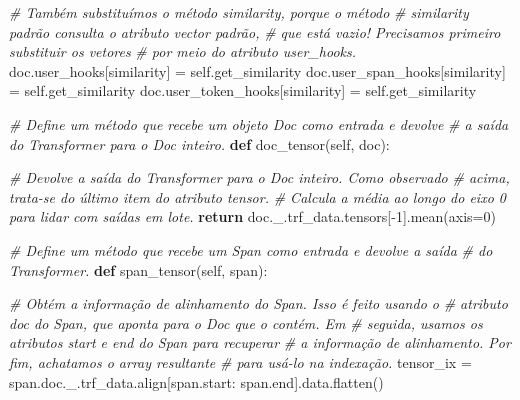 \documentclass[
  brazilian,
]{article}
\newenvironment{Shaded}{}{}
\newcommand{\CommentTok}[1]{\textcolor[rgb]{0.38,0.63,0.69}{\textit{#1}}}
\newcommand{\ControlFlowTok}[1]{\textcolor[rgb]{0.00,0.44,0.13}{\textbf{#1}}}
\newcommand{\DecValTok}[1]{\textcolor[rgb]{0.25,0.63,0.44}{#1}}
\newcommand{\KeywordTok}[1]{\textcolor[rgb]{0.00,0.44,0.13}{\textbf{#1}}}
\newcommand{\NormalTok}[1]{#1}
\newcommand{\OperatorTok}[1]{\textcolor[rgb]{0.40,0.40,0.40}{#1}}
\newcommand{\StringTok}[1]{\textcolor[rgb]{0.25,0.44,0.63}{#1}}
\newcommand{\VariableTok}[1]{\textcolor[rgb]{0.10,0.09,0.49}{#1}}
\begin{document}
\begin{Shaded}
\begin{Highlighting}[]
        \CommentTok{\# Também substituímos o método \textquotesingle{}similarity\textquotesingle{}, porque o método}
        \CommentTok{\# \textquotesingle{}similarity\textquotesingle{} padrão consulta o atributo \textquotesingle{}vector\textquotesingle{} padrão,}
        \CommentTok{\# que está vazio! Precisamos primeiro substituir os vetores}
        \CommentTok{\# por meio do atributo \textquotesingle{}user\_hooks\textquotesingle{}.}
\NormalTok{        doc.user\_hooks[}\StringTok{\textquotesingle{}similarity\textquotesingle{}}\NormalTok{] }\OperatorTok{=} \VariableTok{self}\NormalTok{.get\_similarity}
\NormalTok{        doc.user\_span\_hooks[}\StringTok{\textquotesingle{}similarity\textquotesingle{}}\NormalTok{] }\OperatorTok{=} \VariableTok{self}\NormalTok{.get\_similarity}
\NormalTok{        doc.user\_token\_hooks[}\StringTok{\textquotesingle{}similarity\textquotesingle{}}\NormalTok{] }\OperatorTok{=} \VariableTok{self}\NormalTok{.get\_similarity}
    
    \CommentTok{\# Define um método que recebe um objeto Doc como entrada e devolve}
    \CommentTok{\# a saída do Transformer para o Doc inteiro.}
    \KeywordTok{def}\NormalTok{ doc\_tensor(}\VariableTok{self}\NormalTok{, doc):}
        
        \CommentTok{\# Devolve a saída do Transformer para o Doc inteiro. Como observado}
        \CommentTok{\# acima, trata{-}se do último item do atributo \textquotesingle{}tensor\textquotesingle{}.}
        \CommentTok{\# Calcula a média ao longo do eixo 0 para lidar com saídas em lote.}
        \ControlFlowTok{return}\NormalTok{ doc.\_.trf\_data.tensors[}\OperatorTok{{-}}\DecValTok{1}\NormalTok{].mean(axis}\OperatorTok{=}\DecValTok{0}\NormalTok{)}
    
    \CommentTok{\# Define um método que recebe um Span como entrada e devolve a saída}
    \CommentTok{\# do Transformer.}
    \KeywordTok{def}\NormalTok{ span\_tensor(}\VariableTok{self}\NormalTok{, span):}
        
        \CommentTok{\# Obtém a informação de alinhamento do Span. Isso é feito usando o}
        \CommentTok{\# atributo \textquotesingle{}doc\textquotesingle{} do Span, que aponta para o Doc que o contém. Em}
        \CommentTok{\# seguida, usamos os atributos \textquotesingle{}start\textquotesingle{} e \textquotesingle{}end\textquotesingle{} do Span para recuperar}
        \CommentTok{\# a informação de alinhamento. Por fim, achatamos o array resultante}
        \CommentTok{\# para usá{-}lo na indexação.}
\NormalTok{        tensor\_ix }\OperatorTok{=}\NormalTok{ span.doc.\_.trf\_data.align[span.start: span.end].data.flatten()}
        

\end{Highlighting}
\end{Shaded}
\end{document}
